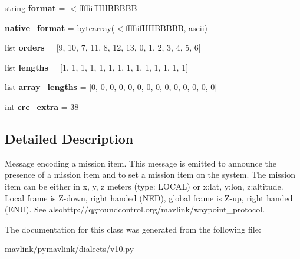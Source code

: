 \begin{DoxyCompactItemize}
\item 
\mbox{\label{classpymavlink_1_1dialects_1_1v10_1_1MAVLink__mission__item__int__message_a68cb2924f50ef41564ff2feb93b41e62}} 
string {\bfseries format} = \textquotesingle{}$<$ffffiif\+H\+H\+B\+B\+B\+BB\textquotesingle{}
\item 
\mbox{\label{classpymavlink_1_1dialects_1_1v10_1_1MAVLink__mission__item__int__message_a5686453f0f48963f50de44471d619bf9}} 
{\bfseries native\+\_\+format} = bytearray(\textquotesingle{}$<$ffffiif\+H\+H\+B\+B\+B\+BB\textquotesingle{}, \textquotesingle{}ascii\textquotesingle{})
\item 
\mbox{\label{classpymavlink_1_1dialects_1_1v10_1_1MAVLink__mission__item__int__message_a30a6c9a89303fd6c57605933c11470d3}} 
list {\bfseries orders} = \mbox{[}9, 10, 7, 11, 8, 12, 13, 0, 1, 2, 3, 4, 5, 6\mbox{]}
\item 
\mbox{\label{classpymavlink_1_1dialects_1_1v10_1_1MAVLink__mission__item__int__message_a49f6be6cdcea1ef668a8d69b08f9656a}} 
list {\bfseries lengths} = \mbox{[}1, 1, 1, 1, 1, 1, 1, 1, 1, 1, 1, 1, 1, 1\mbox{]}
\item 
\mbox{\label{classpymavlink_1_1dialects_1_1v10_1_1MAVLink__mission__item__int__message_ae0ea1ebf615a0dfa08e78b3a0bb4f057}} 
list {\bfseries array\+\_\+lengths} = \mbox{[}0, 0, 0, 0, 0, 0, 0, 0, 0, 0, 0, 0, 0, 0\mbox{]}
\item 
\mbox{\label{classpymavlink_1_1dialects_1_1v10_1_1MAVLink__mission__item__int__message_a1144564229347feb831548eae2b716c9}} 
int {\bfseries crc\+\_\+extra} = 38
\end{DoxyCompactItemize}


\subsection{Detailed Description}
\begin{DoxyVerb}Message encoding a mission item. This message is emitted to
announce                 the presence of a mission item and to
set a mission item on the system. The mission item can be
either in x, y, z meters (type: LOCAL) or x:lat, y:lon,
z:altitude. Local frame is Z-down, right handed (NED), global
frame is Z-up, right handed (ENU). See
alsohttp://qgroundcontrol.org/mavlink/waypoint_protocol.
\end{DoxyVerb}
 

The documentation for this class was generated from the following file\+:\begin{DoxyCompactItemize}
\item 
mavlink/pymavlink/dialects/v10.\+py\end{DoxyCompactItemize}
